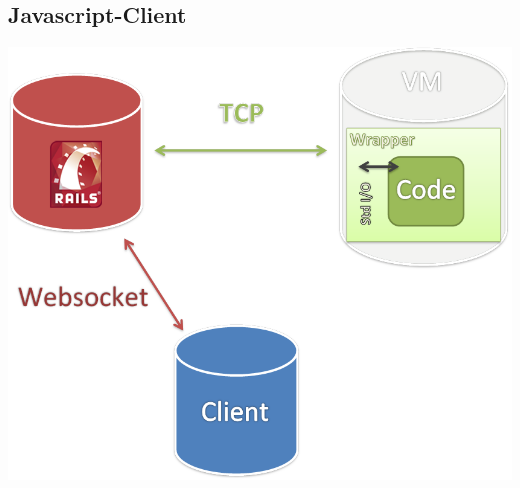 \subsection{Javascript-Client}

\begin{frame}
\begin{center}
	\includegraphics[scale=0.35]{overview}
\end{center}
\end{frame}

